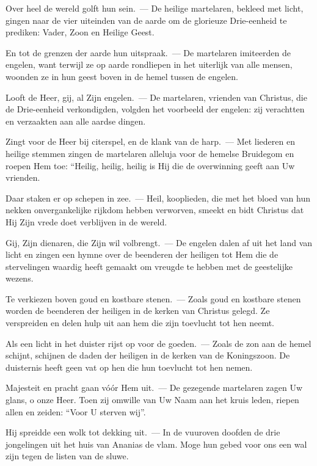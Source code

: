 \documentclass[12pt,twoside,a5paper]{article}
\begin{document}

\begin{halfparskip}
  Over heel de wereld golft hun sein.~--- De heilige martelaren, bekleed met licht, gingen naar de vier uiteinden van de aarde om de glorieuze Drie-eenheid te prediken: Vader, Zoon en Heilige Geest.

  En tot de grenzen der aarde hun uitspraak.~--- De martelaren imiteerden de engelen, want terwijl ze op aarde rondliepen in het uiterlijk van alle mensen, woonden ze in hun geest boven in de hemel tussen de engelen.

  Looft de Heer, gij, al Zijn engelen.~--- De martelaren, vrienden van Christus, die de Drie-eenheid verkondigden, volgden het voorbeeld der engelen: zij verachtten en verzaakten aan alle aardse dingen.

  Zingt voor de Heer bij citerspel, en de klank van de harp.~--- Met liederen en heilige stemmen zingen de martelaren alleluja voor de hemelse Bruidegom en roepen Hem toe: ``Heilig, heilig, heilig is Hij die de overwinning geeft aan Uw vrienden.

  Daar staken er op schepen in zee.~--- Heil, kooplieden, die met het bloed van hun nekken onvergankelijke rijkdom hebben verworven, smeekt en bidt Christus dat Hij Zijn vrede doet verblijven in de wereld.

  Gij, Zijn dienaren, die Zijn wil volbrengt.~--- De engelen dalen af uit het land van licht en zingen een hymne over de beenderen der heiligen tot Hem die de stervelingen waardig heeft gemaakt om vreugde te hebben met de geestelijke wezens.

  Te verkiezen boven goud en kostbare stenen.~--- Zoals goud en kostbare stenen worden de beenderen der heiligen in de kerken van Christus gelegd. Ze verspreiden en delen hulp uit aan hem die zijn toevlucht tot hen neemt.

  Als een licht in het duister rijst op voor de goeden.~--- Zoals de zon aan de hemel schijnt, schijnen de daden der heiligen in de kerken van de Koningszoon. De duisternis heeft geen vat op hen die hun toevlucht tot hen nemen.

  Majesteit en pracht gaan vóór Hem uit.~--- De gezegende martelaren zagen Uw glans, o onze Heer. Toen zij omwille van Uw Naam aan het kruis leden, riepen allen en zeiden: ``Voor U sterven wij''.

  Hij spreidde een wolk tot dekking uit.~--- In de vuuroven doofden de drie jongelingen uit het huis van Ananias de vlam. Moge hun gebed voor ons een wal zijn tegen de listen van de sluwe.


\end{halfparskip}
\end{document}
